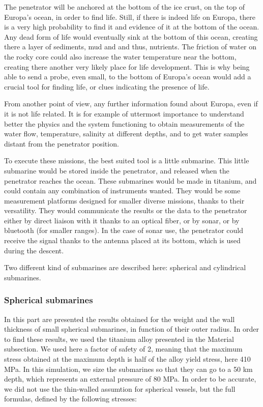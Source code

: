 
The penetrator will be anchored at the bottom of the ice crust, on the top of Europa's ocean, in order to find life. Still, if there is indeed life on Europa, there is a very high probability to find it and evidence of it at the bottom of the ocean. Any dead form of life would eventually sink at the bottom of this ocean, creating there a layer of sediments, mud and and thus, nutrients. The friction of water on the rocky core could also increase the water temperature near the bottom, creating there another very likely place for life development. This is why being able to send a probe, even small, to the bottom of Europa's ocean would add a crucial tool for finding life, or clues indicating the presence of life.


From another point of view, any further information found about Europa, even if it is not life related. It is for example of uttermost importance to understand better the physics and the system functioning to obtain measurements of the water flow, temperature, salinity at different depths, and to get water samples distant from the penetrator position.


To execute these missions, the best suited tool is a little submarine. This little submarine would be stored inside the penetrator, and released when the penetrator  reaches the ocean. These submarines would be made in titanium, and could contain any combination of instruments wanted. They would be some measurement platforms designed for smaller diverse missions, thanks to their versatility. They would communicate the results or the data to the penetrator either by direct liaison with it thanks to an optical fiber, or by sonar, or by bluetooth (for smaller ranges). In the case of sonar use, the penetrator could receive the signal thanks to the antenna placed at its bottom, which is used during the descent.


Two different kind of submarines are described here: spherical and cylindrical submarines.

\subsubsection{Spherical submarines}

In this part are presented the results obtained for the weight and the wall thickness of small spherical submarines, in function of their outer radius. In order to find these results, we used the titanium alloy presented in the Material subsection. We used here a factor of safety of 2, meaning that the maximum stress obtained at the maximum depth is half of the alloy yield stress, here 410 MPa. In this simulation, we size the submarines so that they can go to a 50 km depth, which represents an external pressure of 80 MPa. In order to be accurate, we did not use the thin-walled assumtion for spherical vessels, but the full formulas, defined by the following stresses:

